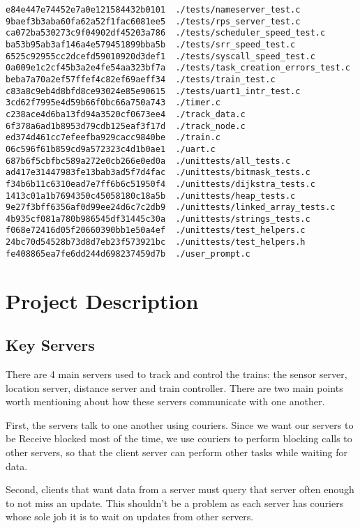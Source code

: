 \documentclass[letterpaper]{article}
\begin{document}
\begin{verbatim}
e84e447e74452e7a0e121584432b0101  ./tests/nameserver_test.c
9baef3b3aba60fa62a52f1fac6081ee5  ./tests/rps_server_test.c
ca072ba530273c9f04902df45203a786  ./tests/scheduler_speed_test.c
ba53b95ab3af146a4e579451899bba5b  ./tests/srr_speed_test.c
6525c92955cc2dcefd59010920d3def1  ./tests/syscall_speed_test.c
0a009e1c2cf45b3a2e4fe54aa323bf7a  ./tests/task_creation_errors_test.c
beba7a70a2ef57ffef4c82ef69aeff34  ./tests/train_test.c
c83a8c9eb4d8bfd8ce93024e85e90615  ./tests/uart1_intr_test.c
3cd62f7995e4d59b66f0bc66a750a743  ./timer.c
c238ace4d6ba13fd94a3520cf0673ee4  ./track_data.c
6f378a6ad1b8953d79cdb125eaf3f17d  ./track_node.c
ed374d461cc7efeefba929cacc9840be  ./train.c
06c596f61b859cd9a572323c4d1b0ae1  ./uart.c
687b6f5cbfbc589a272e0cb266e0ed0a  ./unittests/all_tests.c
ad417e31447983fe13bab3ad5f7d4fac  ./unittests/bitmask_tests.c
f34b6b11c6310ead7e7ff6b6c51950f4  ./unittests/dijkstra_tests.c
1413c01a1b7694350c45058180c18a5b  ./unittests/heap_tests.c
9e27f3bff6356af0d99ee24d6c7c2db9  ./unittests/linked_array_tests.c
4b935cf081a780b986545df31445c30a  ./unittests/strings_tests.c
f068e72416d05f20660390bb1e50a4ef  ./unittests/test_helpers.c
24bc70d54528b73d8d7eb23f573921bc  ./unittests/test_helpers.h
fe408865ea7fe6dd244d698237459d7b  ./user_prompt.c
\end{verbatim}

\section{Project Description}

\subsection{Key Servers}

There are 4 main servers used to track and control the trains: the sensor server, location server, distance server and train controller. There are two main points worth mentioning about how these servers communicate with one another.

First, the servers talk to one another using couriers. Since we want our servers to be Receive blocked most of the time, we use couriers to perform blocking calls to other servers, so that the client server can perform other tasks while waiting for data.

Second, clients that want data from a server must query that server often enough to not miss an update. This shouldn't be a problem as each server has couriers whose sole job it is to wait on updates from other servers.
\end{document}
